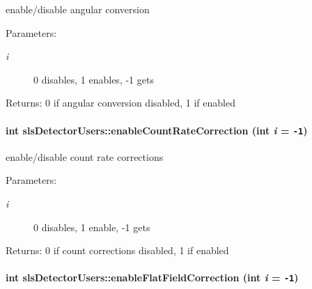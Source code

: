enable/disable angular conversion 

\begin{Desc}
\item[Parameters:]
\begin{description}
\item[{\em i}]0 disables, 1 enables, -1 gets \end{description}
\end{Desc}
\begin{Desc}
\item[Returns:]0 if angular conversion disabled, 1 if enabled \end{Desc}
\hypertarget{classslsDetectorUsers_82efe2f57758d63d330d78b121f8e77e}{
\paragraph[enableCountRateCorrection]{\setlength{\rightskip}{0pt plus 5cm}int sls\-Detector\-Users::enable\-Count\-Rate\-Correction (int {\em i} = {\tt -1})}\hfill}
\label{classslsDetectorUsers_82efe2f57758d63d330d78b121f8e77e}


enable/disable count rate corrections 

\begin{Desc}
\item[Parameters:]
\begin{description}
\item[{\em i}]0 disables, 1 enable, -1 gets \end{description}
\end{Desc}
\begin{Desc}
\item[Returns:]0 if count corrections disabled, 1 if enabled \end{Desc}
\hypertarget{classslsDetectorUsers_94c74499f7653116cd8aff9ec0d14c43}{
\paragraph[enableFlatFieldCorrection]{\setlength{\rightskip}{0pt plus 5cm}int sls\-Detector\-Users::enable\-Flat\-Field\-Correction (int {\em i} = {\tt -1})}\hfill}
\label{classslsDetectorUsers_94c74499f7653116cd8aff9ec0d14c43}



